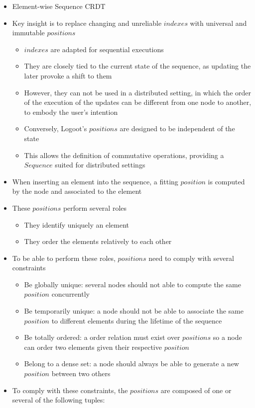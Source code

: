 \documentclass{article}
\begin{document}
\begin{itemize}
    \item Element-wise Sequence \ac{CRDT}
    \item Key insight is to replace changing and unreliable $indexes$ with universal and immutable $positions$
    \begin{itemize}
        \item $indexes$ are adapted for sequential executions
        \item They are closely tied to the current state of the sequence, as updating the later provoke a shift to them
        \item However, they can not be used in a distributed setting, in which the order of the execution of the updates can be different from one node to another, to embody the user's intention
        \item Conversely, Logoot's $positions$ are designed to be independent of the state
        \item This allows the definition of commutative operations, providing a $Sequence$ suited for distributed settings
    \end{itemize}


    \item When inserting an element into the sequence, a fitting $position$ is computed by the node and associated to the element
    \item These $positions$ perform several roles
    \begin{itemize}
        \item They identify uniquely an element
        \item They order the elements relatively to each other
    \end{itemize}
    \item To be able to perform these roles, $positions$ need to comply with several constraints
    \begin{itemize}
        \item Be globally unique: several nodes should not able to compute the same $position$ concurrently
        \item Be temporarily unique: a node should not be able to associate the same $position$ to different elements during the lifetime of the sequence
        \item Be totally ordered: a order relation must exist over $positions$ so a node can order two elements given their respective $position$
        \item Belong to a dense set: a node should always be able to generate a new $position$ between two others
    \end{itemize}
    \item To comply with these constraints, the $positions$ are composed of one or several of the following tuples:


\end{itemize}
\end{document}
